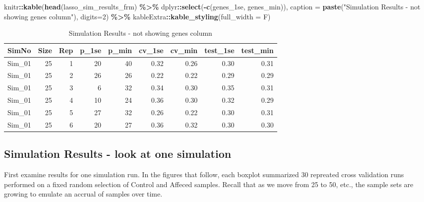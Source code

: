 \documentclass[
]{book}
\newenvironment{Shaded}{\begin{snugshade}}{\end{snugshade}}
\newcommand{\DataTypeTok}[1]{\textcolor[rgb]{0.13,0.29,0.53}{#1}}
\newcommand{\DecValTok}[1]{\textcolor[rgb]{0.00,0.00,0.81}{#1}}
\newcommand{\KeywordTok}[1]{\textcolor[rgb]{0.13,0.29,0.53}{\textbf{#1}}}
\newcommand{\NormalTok}[1]{#1}
\newcommand{\OperatorTok}[1]{\textcolor[rgb]{0.81,0.36,0.00}{\textbf{#1}}}
\newcommand{\StringTok}[1]{\textcolor[rgb]{0.31,0.60,0.02}{#1}}
\begin{document}
\begin{Shaded}
\begin{Highlighting}[]
\NormalTok{knitr}\OperatorTok{::}\KeywordTok{kable}\NormalTok{(}\KeywordTok{head}\NormalTok{(lasso\_sim\_results\_frm) }\OperatorTok{\%>\%}\StringTok{ }\NormalTok{dplyr}\OperatorTok{::}\KeywordTok{select}\NormalTok{(}\OperatorTok{{-}}\KeywordTok{c}\NormalTok{(genes\_1se, genes\_min)),}
    \DataTypeTok{caption =} \KeywordTok{paste}\NormalTok{(}\StringTok{"Simulation Results {-} not showing genes column"}\NormalTok{),}
    \DataTypeTok{digits=}\DecValTok{2}\NormalTok{) }\OperatorTok{\%>\%}
\StringTok{   }\NormalTok{kableExtra}\OperatorTok{::}\KeywordTok{kable\_styling}\NormalTok{(}\DataTypeTok{full\_width =}\NormalTok{ F)}
\end{Highlighting}
\end{Shaded}

\begin{table}

\caption{\label{tab:sum-table}Simulation Results - not showing genes column}
\centering
\begin{tabular}[t]{l|r|r|r|r|r|r|r|r}
\hline
SimNo & Size & Rep & p\_1se & p\_min & cv\_1se & cv\_min & test\_1se & test\_min\\
\hline
Sim\_01 & 25 & 1 & 20 & 40 & 0.32 & 0.26 & 0.30 & 0.31\\
\hline
Sim\_01 & 25 & 2 & 26 & 26 & 0.22 & 0.22 & 0.29 & 0.29\\
\hline
Sim\_01 & 25 & 3 & 6 & 32 & 0.34 & 0.30 & 0.35 & 0.31\\
\hline
Sim\_01 & 25 & 4 & 10 & 24 & 0.36 & 0.30 & 0.32 & 0.29\\
\hline
Sim\_01 & 25 & 5 & 27 & 32 & 0.26 & 0.22 & 0.30 & 0.31\\
\hline
Sim\_01 & 25 & 6 & 20 & 27 & 0.36 & 0.32 & 0.30 & 0.30\\
\hline
\end{tabular}
\end{table}

\hypertarget{simulation-results---look-at-one-simulation}{%
\subsection{Simulation Results - look at one simulation}\label{simulation-results---look-at-one-simulation}}

First examine results for one simulation run. In the figures that follow,
each boxplot summarized 30 repreated cross validation runs performed on a
fixed random selection of Control and Affeced samples. Recall that as
we move from 25 to 50, etc., the sample sets are growing to emulate an
accrual of samples over time.
\end{document}
